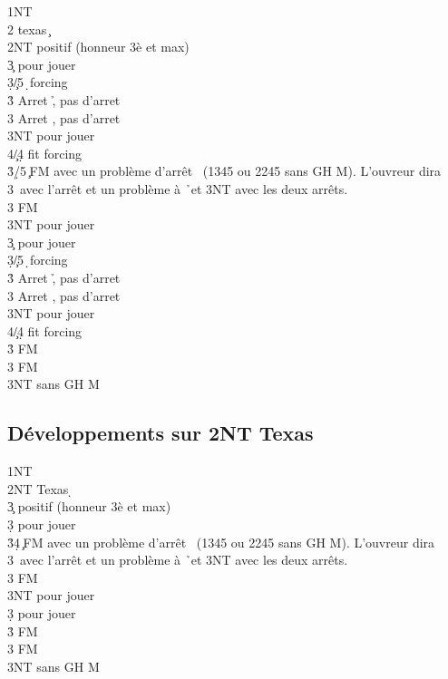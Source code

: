\documentclass[a4paper]{article}
\begin{document}
\begin{bidtable}
1NT\+\\
2\s \> texas \c \+\\
2NT \> positif (honneur 3è et max)\+\\
3\c \> pour jouer\\
3\d {}\c /5\d\ forcing\+\\
3\h \> Arret \h , pas d'arret \s \\
3\s \> Arret \s , pas d'arret \h \\
3NT \> pour jouer\\
4\c/4\d \> fit forcing\-\\
3\h {}\d /5\c\ FM avec un problème d'arrêt \s\ (1345 ou 2245 sans GH M). L'ouvreur dira 3\s\ avec l'arrêt et un problème à \h\ et 3NT avec les deux arrêts.\\
3\s {} FM\\
3NT \> pour jouer\-\\
3\c \> pour jouer\+\\
3\d {}\c /5\d\ forcing\+\\
3\h \> Arret \h , pas d'arret \s \\
3\s \> Arret \s , pas d'arret \h \\
3NT \> pour jouer\\
4\c/4\d \> fit forcing\-\\
3\h {} FM\\
3\s {} FM\\
3NT  sans GH M\-\-\-
\end{bidtable}

\subsection{Développements sur 2NT Texas \pdfd}

\begin{bidtable}
1NT\+\\
2NT \> Texas \d \+\\
3\c \> positif (honneur 3è et max)\+\\
3\d \> pour jouer\\
3\h {}\d 4\c\ FM avec un problème d'arrêt \s\ (1345 ou 2245 sans GH M). L'ouvreur dira 3\s\ avec l'arrêt et un problème à \h\ et 3NT avec les deux arrêts.\\
3\s {} FM\\
3NT \> pour jouer\-\\
3\d \> pour jouer\+\\
3\h {} FM\\
3\s {} FM\\
3NT  sans GH M\-\-\-
\end{bidtable}
\end{document}

